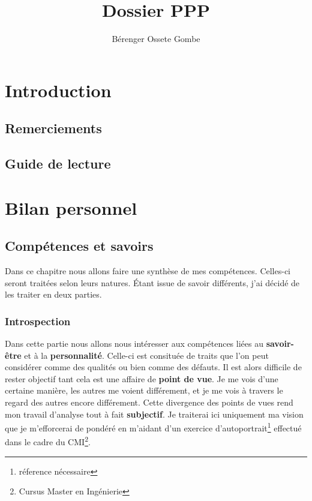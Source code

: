 \documentclass[a4paper,12pt, draft]{report}
\author{Bérenger Ossete Gombe}
\title{Dossier PPP}
\begin{document}
\maketitle

\newpage
\tableofcontents{}
\newpage

\part{Introduction}
\chapter{Remerciements}
\chapter{Guide de lecture}

\part{Bilan personnel}

\chapter{Compétences et savoirs} 

Dans ce chapitre nous allons faire une synthèse de mes compétences.
Celles-ci seront traitées selon leurs natures.
Étant issue de savoir différents, j'ai décidé de les traiter en deux parties.


\section{Introspection}
Dans cette partie nous allons nous intéresser aux compétences liées au \textbf{savoir-être} et à la \textbf{personnalité}. Celle-ci est consituée de traits que l'on peut considérer comme des qualités ou bien comme des défauts. Il est alors difficile de rester objectif tant cela est une affaire de \textbf{point de vue}. Je me vois d'une certaine manière, les autres me voient différement, et je me vois à travers le regard des autres encore différement. Cette divergence des points de vues rend mon travail d'analyse tout à fait \textbf{subjectif}. Je traiterai ici uniquement ma vision que je m'efforcerai de pondéré en m'aidant d'un exercice d'autoportrait\footnote{réference nécessaire} effectué dans le cadre du CMI\footnote{Cursus Master en Ingénierie}.
\end{document}
